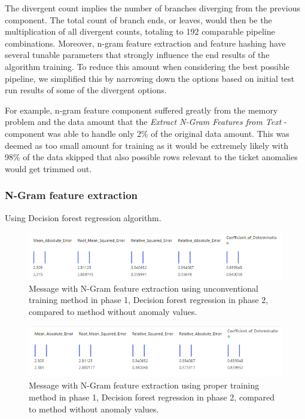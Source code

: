 The divergent count implies the number of branches
diverging from the previous component.
The total count of branch ends, or leaves,
would then be the multiplication of all divergent counts,
totaling to 192 comparable pipeline combinations.
Moreover,
n-gram feature extraction and feature hashing
have several tunable parameters
that strongly influence the end results of the algorithm training.
To reduce this amount when considering the best possible pipeline,
we simplified this by narrowing down the options 
based on initial test run results of some of the divergent options.

For example, 
n-gram feature component suffered greatly from the memory problem %
and the data amount that the \textit{Extract N-Gram Features from Text} -component
was able to handle only 2\% of the original data amount.
This was deemed as too small amount for training
as it would be extremely likely with 98\% of the data skipped
that also possible rows relevant to the ticket anomalies
would get trimmed out.



\clearpage


\subsubsection*{N-Gram feature extraction}
Using Decision forest regression algorithm.
\\
\begin{figure}[htb]
    \centering
    \includegraphics[width=150mm]{./appendices/msg_ngram_decision-forest-reg_lewd2unanom.png}
    \caption{Message with N-Gram feature extraction
    using unconventional training method in phase 1,
        Decision forest regression in phase 2,
        compared to method without anomaly values.
        \label{fig:msg_ngram_decision-forest-reg_lewd2unanom}}
\end{figure}

\begin{figure}[htb]
    \centering
    \includegraphics[width=150mm]{./appendices/msg_ngram_decision-forest-reg_proper2unanom.png}
    \caption{Message with N-Gram feature extraction
    using proper training method in phase 1,
        Decision forest regression in phase 2,
        compared to method without anomaly values.
        \label{fig:msg_ngram_decision-forest-reg_proper2unanom}}
\end{figure}

